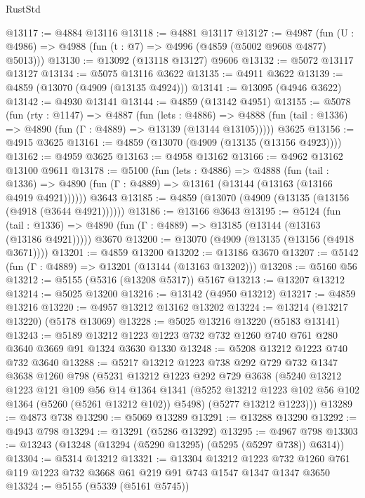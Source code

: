 \begin{lexlean}{RustStd}
\begin{coremodule}
@13117 := @4884 @13116
@13118 := @4881 @13117
@13127 := @4987 (fun (U : @4986) => @4988 (fun (t : @7) => @4996 (@4859 (@5002 @9608 @4877) @5013)))
@13130 := @13092 (@13118 @13127) @9606
@13132 := @5072 @13117 @13127
@13134 := @5075 @13116 @3622
@13135 := @4911 @3622
@13139 := @4859 (@13070 (@4909 (@13135 @4924)))
@13141 := @13095 (@4946 @3622)
@13142 := @4930 @13141
@13144 := @4859 (@13142 @4951)
@13155 := @5078
    (fun (rty : @1147) =>
    @4887
      (fun (lets : @4886) =>
      @4888 (fun (tail : @1336) => @4890 (fun (Γ : @4889) => @13139 (@13144 @13105)))))
    @3625
@13156 := @4915 @3625
@13161 := @4859 (@13070 (@4909 (@13135 (@13156 @4923))))
@13162 := @4959 @3625
@13163 := @4958 @13162
@13166 := @4962 @13162 @13100 @9611
@13178 := @5100
    (fun (lets : @4886) =>
    @4888
      (fun (tail : @1336) =>
      @4890 (fun (Γ : @4889) => @13161 (@13144 (@13163 (@13166 @4919 @4921))))))
    @3643
@13185 := @4859 (@13070 (@4909 (@13135 (@13156 (@4918 (@3644 @4921))))))
@13186 := @13166 @3643
@13195 := @5124
    (fun (tail : @1336) => @4890 (fun (Γ : @4889) => @13185 (@13144 (@13163 (@13186 @4921)))))
    @3670
@13200 := @13070 (@4909 (@13135 (@13156 (@4918 @3671))))
@13201 := @4859 @13200
@13202 := @13186 @3670
@13207 := @5142 (fun (Γ : @4889) => @13201 (@13144 (@13163 @13202)))
@13208 := @5160 @56
@13212 := @5155 (@5316 (@13208 @5317)) @5167
@13213 := @13207 @13212
@13214 := @5025 @13200
@13216 := @13142 (@4950 @13212)
@13217 := @4859 @13216
@13220 := @4957 @13212 @13162 @13202
@13224 := @13214 (@13217 @13220) (@5178 @13069)
@13228 := @5025 @13216 @13220 (@5183 @13141)
@13243 := @5189 @13212 @1223 @1223 @732 @732 @1260 @740 @761 @280 @3640 @3669 @91 @1324 @3630 @1330
@13248 := @5208 @13212 @1223 @740 @732 @3640
@13288 := @5217
    @13212
    @1223
    @738
    @292
    @729
    @732
    @1347
    @3638
    @1260
    @798
    (@5231
      @13212
      @1223
      @292
      @729
      @3638
      (@5240
        @13212
        @1223
        @121
        @109
        @56
        @14
        @1364
        @1341
        (@5252 @13212 @1223 @102 @56 @102 @1364 (@5260 (@5261 @13212 @102)) @5498)
        (@5277 @13212 @1223)))
@13289 := @4873 @738
@13290 := @5069 @13289
@13291 := @13288 @13290
@13292 := @4943 @798
@13294 := @13291 (@5286 @13292)
@13295 := @4967 @798
@13303 := @13243 (@13248 (@13294 (@5290 @13295) (@5295 (@5297 @738)) @6314))
@13304 := @5314 @13212
@13321 := @13304
    @13212
    @1223
    @732
    @1260
    @761
    @119
    @1223
    @732
    @3668
    @61
    @219
    @91
    @743
    @1547
    @1347
    @1347
    @3650
@13324 := @5155 (@5339 (@5161 @5745))

\end{coremodule}
\end{lexlean}
